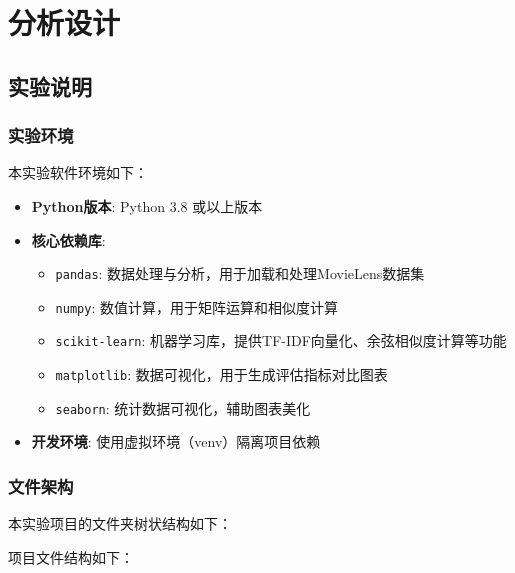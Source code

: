 \documentclass[a4paper]{article}
\begin{document}
\section{分析设计}

\subsection{实验说明}

\subsubsection{实验环境}

本实验软件环境如下：

\begin{itemize}
    \item \textbf{Python版本}: Python 3.8 或以上版本
    \item \textbf{核心依赖库}:
    \begin{itemize}
        \item \texttt{pandas}: 数据处理与分析，用于加载和处理MovieLens数据集
        \item \texttt{numpy}: 数值计算，用于矩阵运算和相似度计算
        \item \texttt{scikit-learn}: 机器学习库，提供TF-IDF向量化、余弦相似度计算等功能
        \item \texttt{matplotlib}: 数据可视化，用于生成评估指标对比图表
        \item \texttt{seaborn}: 统计数据可视化，辅助图表美化
    \end{itemize}
    \item \textbf{开发环境}: 使用虚拟环境（venv）隔离项目依赖
\end{itemize}

\subsubsection{文件架构}

本实验项目的文件夹树状结构如下：

项目文件结构如下：
\end{document}
